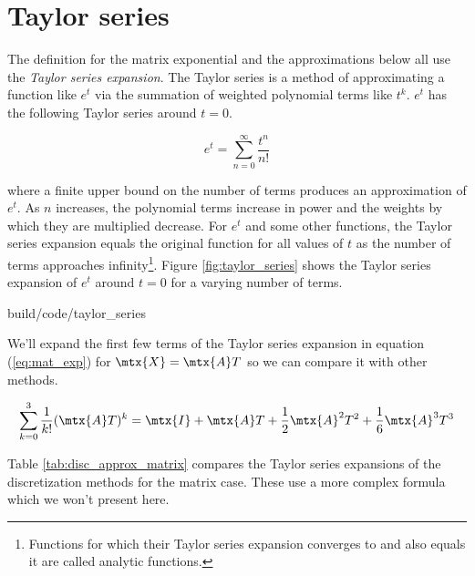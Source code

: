 \section{Taylor series}
The definition for the matrix exponential and the approximations below all use
the \textit{Taylor series expansion}. The Taylor series is a method of
approximating a function like $e^t$ via the summation of weighted polynomial
terms like $t^k$. $e^t$ has the following Taylor series around $t = 0$.

\begin{equation*}
  e^t = \sum_{n = 0}^\infty \frac{t^n}{n!}
\end{equation*}

where a finite upper bound on the number of terms produces an approximation of
$e^t$. As $n$ increases, the polynomial terms increase in power and the weights
by which they are multiplied decrease. For $e^t$ and some other functions, the
Taylor series expansion equals the original function for all values of $t$ as
the number of terms approaches infinity\footnote{Functions for which their
Taylor series expansion converges to and also equals it are called analytic
functions.}. Figure \ref{fig:taylor_series} shows the Taylor series expansion of
$e^t$ around $t = 0$ for a varying number of terms.

\begin{svg}{build/code/taylor_series}
  \caption{Taylor series expansions of $e^t$ around $t = 0$ for $n$ terms}
  \label{fig:taylor_series}
\end{svg}

We'll expand the first few terms of the Taylor series expansion in equation
(\ref{eq:mat_exp}) for $\mtx{X} = \mtx{A}T$ so we can compare it with other
methods.

\begin{equation*}
  \sum_{k=0}^3 \frac{1}{k!} (\mtx{A}T)^k = \mtx{I} + \mtx{A}T +
    \frac{1}{2}\mtx{A}^2T^2 + \frac{1}{6}\mtx{A}^3T^3
\end{equation*}

Table \ref{tab:disc_approx_matrix} compares the Taylor series expansions of the
\gls{discretization} methods for the matrix case. These use a more complex
formula which we won't present here.

